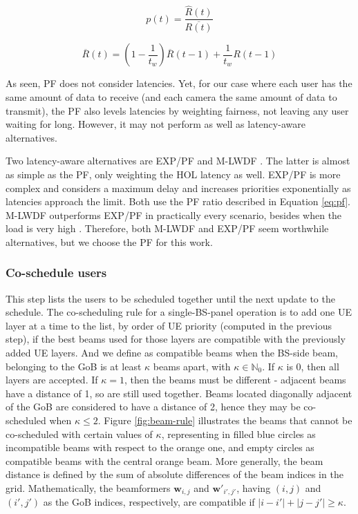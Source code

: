 \begin{equation} \label{eq:pf}
    p(t) = \frac{\hat{R}(t)}{\overline{R(t)}}
\end{equation}

\begin{equation} \label{eq:pf2}
    \overline{R}(t) = \left( 1 - \frac{1}{t_w} \right) \overline{R} (t-1) + \frac{1}{t_w} R(t-1)
\end{equation}

As seen, PF does not consider latencies. Yet, for our case where each user has the same amount of data to receive (and each camera the same amount of data to transmit), the PF also levels latencies by weighting fairness, not leaving any user waiting for long. However, it may not perform as well as latency-aware alternatives.

Two latency-aware alternatives are \ac{EXP/PF} \cite{exp_algorithm} and \ac{M-LWDF} \cite{scheduler_performance_eval}. The latter is almost as simple as the PF, only weighting the \ac{HOL} latency as well. \ac{EXP/PF} is more complex and considers a maximum delay and increases priorities exponentially as latencies approach the limit. Both use the PF ratio described in Equation \eqref{eq:pf}. \ac{M-LWDF} outperforms \ac{EXP/PF} in practically every scenario, besides when the load is very high \cite{scheduler_performance_eval} \cite{5340336}. Therefore, both \ac{M-LWDF} and \ac{EXP/PF} seem worthwhile alternatives, but we choose the PF for this work.

\subsubsection*{Co-schedule users}
This step lists the users to be scheduled together until the next update to the schedule. The co-scheduling rule for a single-BS-panel operation is to add one UE layer at a time to the list, by order of \ac{UE} priority (computed in the previous step), if the best beams used for those layers are compatible with the previously added \ac{UE} layers. And we define as compatible beams when the BS-side beam, belonging to the \ac{GoB} is at least $\kappa$ beams apart, with $\kappa \in \mathbb{N}_0$. If $\kappa$ is 0, then all layers are accepted. If $\kappa = 1$, then the beams must be different - adjacent beams have a distance of 1, so are still used together. Beams located diagonally adjacent of the \ac{GoB} are considered to have a distance of 2, hence they may be co-scheduled when $\kappa \leq 2$. Figure \ref{fig:beam-rule} illustrates the beams that cannot be co-scheduled with certain values of $\kappa$, representing in filled blue circles as incompatible beams with respect to the orange one, and empty circles as compatible beams with the central orange beam. More generally, the beam distance is defined by the sum of absolute differences of the beam indices in the grid. Mathematically, the beamformers $\bm{w}_{i,j}$ and $\bm{w}'_{i',j'}$, having $(i,j)$ and $(i', j')$ as the GoB indices, respectively, are compatible if $|i-i'| + |j - j'| \geq \kappa$.
    
